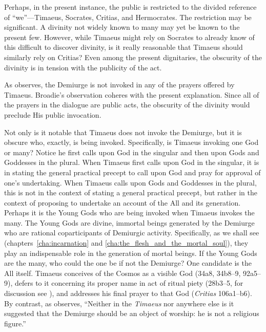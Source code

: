 Perhaps, in the present instance, the public is restricted to the divided reference of ``we''---Timaeus, Socrates, Critias, and Hermocrates. The restriction may be significant. A divinity not widely known to many may yet be known to the present few. However, while Timaeus might rely on Socrates to already know of this difficult to discover divinity, is it really reasonable that Timaeus should similarly rely on Critias? Even among the present dignitaries, the obscurity of the divinity is in tension with the publicity of the act.

As \citet[13--4]{Broadie:2012vl} observes, the Demiurge is not invoked in any of the prayers offered by Timaeus. Broadie's observation coheres with the present explanation. Since all of the prayers in the dialogue are public acts, the obscurity of the divinity would preclude His public invocation.

Not only is it notable that Timaeus does not invoke the Demiurge, but it is obscure who, exactly, is being invoked. Specifically, is Timaeus invoking one God or many? Notice he first calls upon God in the singular and then upon Gods and Goddesses in the plural. When Timaeus first calls upon God in the singular, it is in stating the general practical precept to call upon God and pray for approval of one's undertaking. When Timaeus calls upon Gods and Goddesses in the plural, this is not in the context of stating a general practical precept, but rather in the context of proposing to undertake an account of the All and its generation. Perhaps it is the Young Gods who are being invoked when Timaeus invokes the many. The Young Gods are divine, immortal beings generated by the Demiurge who are rational coparticipants of Demiurgic activity. Specifically, as we shall see (chapters~\ref{cha:incarnation} and \ref{cha:the_flesh_and_the_mortal_soul}), they play an indispensable role in the generation of mortal beings. If the Young Gods are the many, who could the one be if not the Demiurge? One candidate is the All itself. Timaeus conceives of the Cosmos as a visible God (34a8, 34b8--9, 92a5--9), defers to it concerning its proper name in act of ritual piety (28b3--5, for discussion see \citealt[66]{Taylor:1928qb}), and addresses his final prayer to that God (\emph{Critias} 106a1--b6). By contrast, as \citet[35]{Cornford:1935fk} observes, ``Neither in the \emph{Timaeus} nor anywhere else is it suggested that the Demiurge should be an object of worship: he is not a religious figure.''

